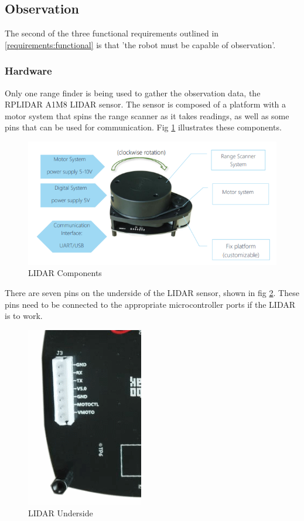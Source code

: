 			\subsection{Observation}
			The second of the three functional requirements outlined in \ref{requirements:functional} is that 'the robot must be capable of observation'.
				\subsubsection{Hardware}
				Only one range finder is being used to gather the observation data, the RPLIDAR A1M8 LIDAR sensor. The sensor is composed of a platform with a motor system that spins the range scanner as it takes readings, as well as some pins that can be used for communication. Fig \ref{fig:rplidarconfig} illustrates these components.
				
				\begin{figure}[h]
					\centering
					\includegraphics[width=.9\linewidth]{SYNTHESIS/rplidar_configuration.png}
					\caption{LIDAR Components}
					\label{fig:rplidarconfig}
				\end{figure}
			
				There are seven pins on the underside of the LIDAR sensor, shown in fig \ref{fig:lidarunderside}. These pins need to be connected to the appropriate microcontroller ports if the LIDAR is to work. 
				\begin{figure}[h]
					\centering
					\includegraphics[width=.3\linewidth]{SYNTHESIS/lidarunderside.png}
					\caption{LIDAR Underside}
					\label{fig:lidarunderside}
				\end{figure}
				
